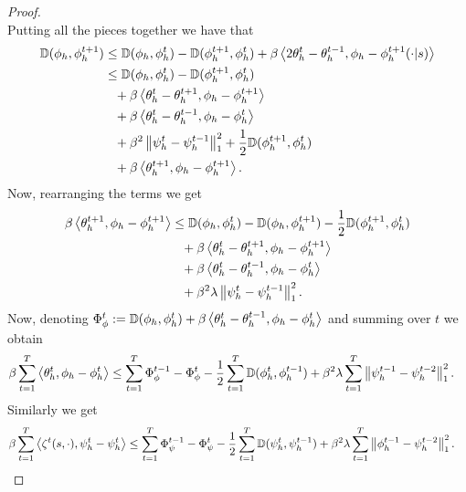\begin{proof}
\begin{equation*}
\end{equation*}
Putting all the pieces together we have that
\begin{align*}
\mathbb{D}(\phi_h,\phi_h^{t+1}) &\leq \mathbb{D}(\phi_h,\phi_h^{t}) - \mathbb{D}(\phi_h^{t+1},\phi_h^{t}) +  \beta \left\langle{2 \theta^{t}_h - \theta^{t-1}_h},{\phi_h - \phi_h^{t+1}(\cdot|s)}\right\rangle \\
&\leq \mathbb{D}(\phi_h,\phi_h^{t}) - \mathbb{D}(\phi_h^{t+1},\phi_h^{t}) \\
&\phantom{=} +  \beta \left\langle{ \theta_h^{t} - \theta_h^{t+1}},{\phi_h - \phi_h^{t+1}}\right\rangle \\
&\phantom{=}+  \beta \left\langle{ \theta_h^{t}- \theta_h^{t-1}},{\phi_h - \phi_h^{t}}\right\rangle \\
&\phantom{=}+  \beta^2 \left\lVert\psi_h^{t} - \psi_h^{t-1}\right\rVert^2_1 + \frac{1}{2}\mathbb{D}(\phi_h^{t+1},\phi_h^{t}) \\
&\phantom{=}+ \beta \left\langle{ \theta_h^{t+1}},{\phi_h - \phi_h^{t+1}}\right\rangle.
\end{align*}
Now, rearranging the terms we get
\begin{align*}
 \beta \left\langle{ \theta^{t+1}_h},{\phi_h - \phi_h^{t+1}}\right\rangle
&\leq \mathbb{D}(\phi_h,\phi_h^{t}) - \mathbb{D}(\phi_h,\phi_h^{t+1}) - \frac{1}{2}\mathbb{D}(\phi_h^{t+1},\phi_h^{t}) \\
&\phantom{=} +  \beta \left\langle{ \theta_h^{t} - \theta_h^{t+1}},{\phi_h - \phi_h^{t+1}}\right\rangle \\
&\phantom{=}+  \beta \left\langle{ \theta_h^{t} - \theta_h^{t-1}},{\phi_h - \phi_h^{t}}\right\rangle \\
&\phantom{=}+  \beta^2 \lambda \left\lVert\psi^{t}_h - \psi_h^{t-1}\right\rVert^2_1. 
\end{align*}
Now, denoting $\Phi_\phi^t := \mathbb{D}(\phi_h,\phi_h^{t}) +   \beta \left\langle{ \theta^{t}_h - \theta^{t-1}_h},{\phi_h- \phi_h^{t}}\right\rangle$ and summing over $t$ we obtain
\begin{align*}
 \beta \sum^T_{t=1}\left\langle{ \theta^{t}_h},{\phi_h - \phi_h^{t}}\right\rangle
&\leq \sum^T_{t=1} \Phi_\phi^{t-1} - \Phi_\phi^t - \frac{1}{2} \sum^T_{t=1} \mathbb{D}(\phi_h^t, \phi_h^{t-1}) +   \beta^2 \lambda \sum^T_{t=1} \left\lVert\psi_h^{t-1}- \psi_h^{t-2}\right\rVert^2_1.
\end{align*}
Similarly we get
\begin{align*}
 \beta \sum^T_{t=1}\left\langle{ \zeta^{t}(s, \cdot)},{\psi^t_h - \psi_h^{t}}\right\rangle
&\leq \sum^T_{t=1} \Phi_\psi^{t-1} - \Phi_\psi^t - \frac{1}{2} \sum^T_{t=1} \mathbb{D}(\psi_h^t, \psi_h^{t-1}) + \beta^2 \lambda \sum^T_{t=1} \left\lVert\phi_h^{t-1} - \psi_h^{t-2}\right\rVert^2_1.
\end{align*}

\end{proof}
